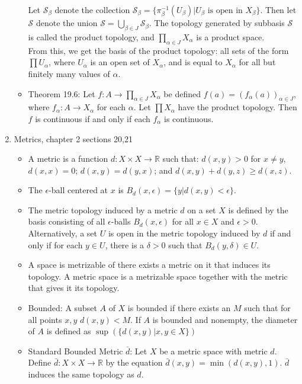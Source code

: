 \documentclass[12pt,letterpaper]{article}
\begin{document}
\begin{enumerate}
\begin{itemize}
    Let $\mathcal{S}_\beta$ denote the collection $\mathcal{S}_\beta = \{\pi_\beta^{-1}(U_\beta) | U_\beta \text{ is open in } X_\beta\}$. Then let $\mathcal{S}$ denote the union $\mathcal{S}=\displaystyle\bigcup_{\beta\in J}\mathcal{S}_\beta$. The topology generated by subbasis $\mathcal{S}$ is called the product topology, and $\prod_{\alpha\in J} X_\alpha$ is a product space.\\
    From this, we get the basis of the product topology: all sets of the form $\prod U_\alpha$, where $U_\alpha$ is an open set of $X_\alpha$, and is equal to $X_\alpha$ for all but finitely many values of $\alpha$.
    \item \label{thm:MapsProducts19.6} Theorem 19.6: Let $f: A \rightarrow \prod_{\alpha\in J}X_\alpha$ be defined $f(a) = (f_\alpha(a))_{\alpha \in J}$, where $f_\alpha : A \rightarrow X_\alpha$ for each $\alpha$. Let $\prod X_\alpha$ have the product topology. Then $f$ is continuous if and only if each $f_\alpha$ is continuous.
  \end{itemize}
  \item \label{dfn:metric} Metrics, chapter 2 sections 20,21
  \begin{itemize}
    \item A metric is a function $d: X \times X \rightarrow \mathbb{R}$ such that: $d(x,y)>0$ for $x\neq y$, $d(x,x)=0$; $d(x,y)=d(y,x)$; and $d(x,y) + d(y,z)\geq d(x,z)$.
    \item The $\epsilon$-ball centered at $x$ is $B_d(x, \epsilon) = \{ y | d(x,y) < \epsilon \}$.
    \item \label{dfn:metricTopology} The metric topology induced by a metric $d$ on a set $X$ is defined by the basis consisting of all $\epsilon$-balls $B_d(x,\epsilon)$ for all $x\in X$ and $\epsilon > 0$. Alternatively, a set $U$ is open in the metric topology induced by $d$ if and only if for each $y\in U$, there is a $\delta > 0$ such that $B_d(y,\delta) \in U$.
    \item A space is metrizable of there exists a metric on it that induces its topology. A metric space is a metrizable space together with the metric that gives it its topology.
    \item Bounded: A subset $A$ of $X$ is bounded if there exists an $M$ such that for all points $x,y$ $d(x,y)<M$. If $A$ is bounded and nonempty, the diameter of $A$ is defined as $\sup( \{d(x,y) | x,y\in X\})$
    \item Standard Bounded Metric $\bar{d}$: Let $X$ be a metric space with metric $d$. Define $\bar{d}: X\times X \rightarrow \mathbb{R}$ by the equation $\bar{d}(x,y) = \min(d(x,y),1)$. $\bar{d}$ induces the same topology as $d$.

\end{itemize}
\end{enumerate}
\end{document}
